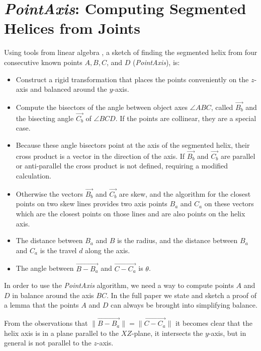 \documentclass{svproc}
\begin{document}
\section{{\em PointAxis}: Computing Segmented Helices from Joints}
\label{sec:pointaxis}

Using tools from linear algebra \cite{kahn1989defining}, a sketch of finding the segmented helix from
four consecutive known points $A,B,C$, and $D$ ({\em PointAxis}), is:
\begin{itemize}
\item Construct a rigid transformation that places the points conveniently on the $z$-axis and balanced
  around the $y$-axis.
\item Compute the bisectors of the angle between object axes $ \angle{ABC}$, called $\overrightarrow{B_b}$ and the
  bisecting angle $\overrightarrow{C_b}$ of $\angle{BCD}$.
  If the points are collinear, they are a special case.
\item Because these angle bisectors point at the axis of the segmented helix, their cross product is a vector
  in the direction of the axis. If $\overrightarrow{B_b}$ and $\overrightarrow{C_b}$ are parallel or anti-parallel the cross product is not defined, requiring a modified calculation.
\item  Otherwise the vectors $\overrightarrow{B_b}$ and $\overrightarrow{C_b}$ are skew, and the algorithm for the closest points on
  two skew lines provides two axis points $B_a$ and $C_a$ on these vectors which
  are the closest points on those lines and are also points on the helix axis.
\item The distance between $B_a$ and $B$ is the radius, and the distance between $B_a$ and $C_a$ is the travel $d$ along the axis.
  \item The angle between $\overrightarrow{B - B_a}$ and $\overrightarrow{C - C_a}$ is $\theta$.
\end{itemize}

In order to use the {\em PointAxis} algorithm, we need a way
to compute points $A$ and $D$ in balance around the axis $BC$. In the full paper\cite{readfullsegmentedhelix}
we state and sketch a proof of a lemma that the points $A$ and $D$ can always be brought into simplifying balance.

From the observations that $\| \overrightarrow{B - B_a} \| = \| \overrightarrow{C - C_a} \|$
it becomes clear that the helix axis is in a plane
parallel to the $XZ$-plane, it intersects the $y$-axis, but in general is
not parallel to the $z$-axis.
\end{document}
